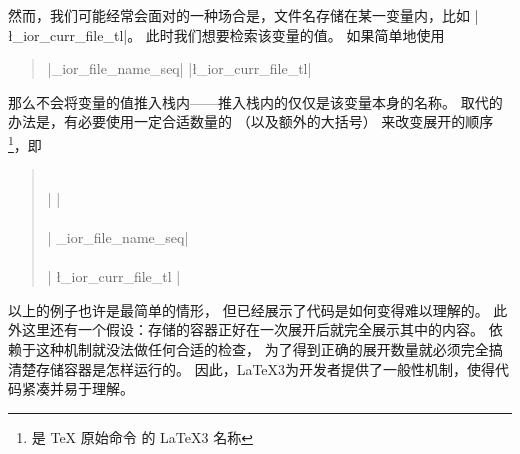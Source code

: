 \documentclass[full]{l3doc}
\begin{document}
%
然而，我们可能经常会面对的一种场合是，文件名存储在某一变量内，比如 |\l_ior_curr_file_tl|。
此时我们想要检索该变量的值。
如果简单地使用
\begin{quote}
     |\g_ior_file_name_seq| |\l_ior_curr_file_tl|
\end{quote}
那么不会将变量的值推入栈内——推入栈内的仅仅是该变量本身的名称。
取代的办法是，有必要使用一定合适数量的  （以及额外的大括号）
来改变展开的顺序\footnote{
 是 \TeX{} 原始命令  的 \LaTeX3 名称}，即
\begin{quote}
                              \\
|   |                         \\
                              \\
|   \g_ior_file_name_seq|                      \\
                              \\
|   { \l_ior_curr_file_tl }|
\end{quote}

%
以上的例子也许是最简单的情形，
但已经展示了代码是如何变得难以理解的。
此外这里还有一个假设：存储的容器正好在一次展开后就完全展示其中的内容。
依赖于这种机制就没法做任何合适的检查，
为了得到正确的展开数量就必须完全搞清楚存储容器是怎样运行的。
因此，\LaTeX3为开发者提供了一般性机制，使得代码紧凑并易于理解。
\end{document}
